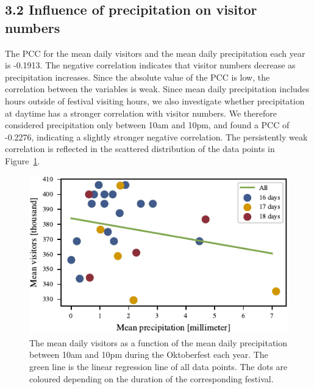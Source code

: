 \documentclass{article}
\theoremstyle{plain}
\theoremstyle{definition}
\theoremstyle{remark}
\begin{document}
\subsection*{3.2 Influence of precipitation on visitor numbers}
The PCC for the mean daily visitors and the mean daily precipitation each year is -0.1913. The negative correlation indicates that visitor numbers decrease as precipitation increases. Since the absolute value of the PCC is low, the correlation between the variables is weak. Since mean daily precipitation includes hours outside of festival visiting hours, we also investigate whether precipitation at daytime has a stronger correlation with visitor numbers. We therefore considered precipitation only between 10am and 10pm, and found a PCC of -0.2276, indicating a slightly stronger negative correlation. The persistently weak correlation is reflected in the scattered distribution of the data points in Figure~\ref{figure_precipitation}.
\begin{figure}[ht]%
  \includegraphics{fig/totalprecipitation.pdf}
  \caption{The mean daily visitors as a function of the mean daily precipitation between 10am and 10pm during the Oktoberfest each year. The green line is the linear regression line of all data points. The dots are coloured depending on the duration of the corresponding festival.}
  \label{figure_precipitation}
\end{figure}
\end{document}
